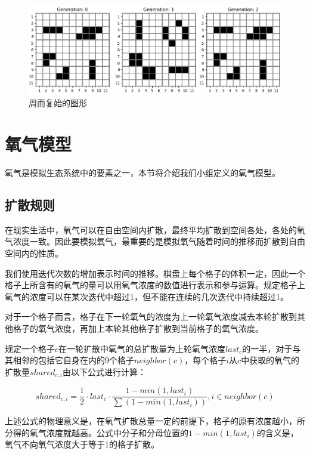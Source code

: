 \documentclass{ctexart}
\begin{document}
\begin{figure}[ht]
  \centering
  \includegraphics[width=\textwidth]{classic-vibrating.png}
  \caption{周而复始的图形}
  \label{fig:classic-vibrating}
\end{figure}

\section{氧气模型}

氧气是模拟生态系统中的要素之一，本节将介绍我们小组定义的氧气模型。

\subsection{扩散规则}

在现实生活中，氧气可以在自由空间内扩散，最终平均扩散到空间各处，各处的氧气浓度一致。因此要模拟氧气，最重要的是模拟氧气随着时间的推移而扩散到自由空间内的性质。

我们使用迭代次数的增加表示时间的推移。棋盘上每个格子的体积一定，因此一个格子上所含有的氧气的量可以用氧气浓度的数值进行表示和参与运算。规定格子上氧气的浓度可以在某次迭代中超过1，但不能在连续的几次迭代中持续超过1。

对于一个格子而言，格子在下一轮氧气的浓度为上一轮氧气浓度减去本轮扩散到其他格子的氧气浓度，再加上本轮其他格子扩散到当前格子的氧气浓度。

规定一个格子$c$在一轮扩散中氧气的总扩散量为上轮氧气浓度$last_c$的一半，对于与其相邻的包括它自身在内的9个格子$neighbor(c)$，每个格子$i$从$c$中获取的氧气的扩散量$shared_{c, i}$由以下公式进行计算：

\begin{equation}
  \label{equ:share-oxygen}
  shared_{c, i} = \frac{1}{2} \cdot last_c \cdot \frac{1 - min(1, last_i)}{\sum (1 - min(1, last_i))}, i \in neighbor(c)
\end{equation}

上述公式的物理意义是，在氧气扩散总量一定的前提下，格子的原有浓度越小，所分得的氧气浓度就越高。公式中分子和分母位置的$1 - min(1, last_i)$的含义是，氧气不向氧气浓度大于等于1的格子扩散。
\end{document}
